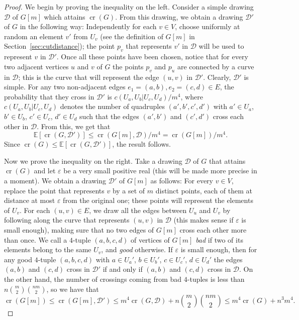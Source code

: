 \documentclass{article}
\begin{document}
\begin{proof}
We begin by proving the inequality on the left. Consider a simple drawing $\mathcal{D}$ of $G[m]$ which attains $\mathop{\mathrm{cr}}(G)$. From this drawing, we obtain a drawing $\mathcal{D}'$ of $G$ in the following way: Independently for each $v\in V$, choose uniformly at random an element $v'$ from $U_v$ (see the definition of $G[m]$ in Section~\ref{sec:cutdistance}); the point $p_v$ that represents $v'$ in $\mathcal{D}$ will be used to represent $v$ in $\mathcal{D}'$. Once all these points have been chosen, notice that for every two adjacent vertices $u$ and $v$ of $G$ the points $p_v$ and $p_u$ are connected by a curve in $\mathcal{D}$; this is the curve that will represent the edge $(u,v)$ in $\mathcal{D}'$. Clearly, $\mathcal{D}'$ is simple. For any two non-adjacent edges $e_1=(a,b),e_2=(c,d)\in E$, the probability that they cross in $\mathcal{D}'$ is $ c(U_a,U_b|U_c,U_d)/m^4$, where $c(U_a,U_b|U_c,U_d)$ denotes the number of quadruples $(a',b',c',d')$ with $a'\in U_a$, $b'\in U_b$, $c'\in U_c$, $d'\in U_d$ such that the edges $(a',b')$ and $(c',d')$ cross each other in $\mathcal{D}$. From this, we get that \[\mathbb{E}[\mathop{\mathrm{cr}}(G,\mathcal{D}')]\leq\mathop{\mathrm{cr}}(G[m],\mathcal{D})/m^4=\mathop{\mathrm{cr}}(G[m])/m^4.\] Since $\mathop{\mathrm{cr}}(G)\leq\mathbb{E}[\mathop{\mathrm{cr}}(G,\mathcal{D}')]$, the result follows.

Now we prove the inequality on the right. Take a drawing $\mathcal{D}$ of $G$ that attains $\mathop{\mathrm{cr}}(G)$ and let $\varepsilon$ be a very small positive real (this will be made more precise in a moment). We obtain a drawing $\mathcal{D}'$ of $G[m]$ as follows: For every $v\in V$, replace the point that represents $v$ by a set of $m$ distinct points, each of them at distance at most $\varepsilon$ from the original one; these points will represent the elements of $U_v$. For each $(u,v)\in E$, we draw all the edges between $U_u$ and $U_v$ by following along the curve that represents $(u,v)$ in $\mathcal{D}$ (this makes sense if $\varepsilon$ is small enough), making sure that no two edges of $G[m]$ cross each other more than once. We call a $4$-tuple $(a,b,c,d)$ of vertices of $G[m]$ \textit{bad} if two of its elements belong to the same $U_v$, and \textit{good} otherwise. If $\varepsilon$ is small enough, then for any good $4$-tuple $(a,b,c,d)$ with $a\in U_a'$, $b\in U_b'$, $c\in U_c'$, $d\in U_d'$ the edges $(a,b)$ and $(c,d)$ cross in $\mathcal{D}'$ if and only if $(a,b)$ and $(c,d)$ cross in $\mathcal{D}$. On the other hand, the number of crossings coming from bad $4$-tuples is less than $n\binom{m}{2}\binom{nm}{2}$, so we have that \[\mathop{\mathrm{cr}}(G[m])\leq\mathop{\mathrm{cr}}(G[m],\mathcal{D}')\leq m^4\mathop{\mathrm{cr}}(G,\mathcal{D})+n\binom{m}{2}\binom{nm}{2}\leq m^4\mathop{\mathrm{cr}}(G)+n^3m^4.\]  
\end{proof}
\end{document}
